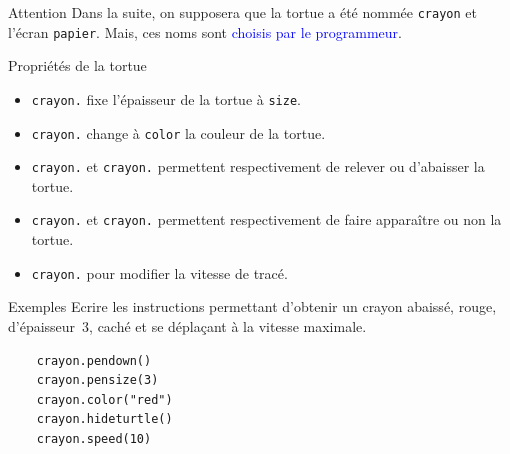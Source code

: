 \documentclass[10pt]{beamer}
\begin{document}
\begin{frame}[fragile]
	\mframe{\Python}
	\begin{alertblock}{\textcolor{yellow}{\danger} Attention}
		Dans la suite, on supposera que la tortue a été nommée {\tt crayon} et l'écran {\tt papier}. Mais, ces noms sont \textcolor{blue}{choisis par le programmeur}.
	\end{alertblock}
	\begin{block}{Propriétés de la tortue}
		\begin{itemize}
			\item<2-> {\tt crayon.} fixe l'épaisseur de la tortue à {\tt size}.
			\item<3-> {\tt crayon.} change à {\tt color} la couleur de la tortue.
			\item<4-> {\tt crayon.} et {\tt crayon.} permettent respectivement de relever ou d'abaisser la tortue.
			\item<5-> {\tt crayon.} et {\tt crayon.} permettent respectivement de faire apparaître ou non la tortue.
			\item<6-> {\tt crayon.}  pour modifier la vitesse de tracé.
		\end{itemize}
	\end{block}
\end{frame}

\begin{frame}[fragile]
	\mframe{\Python}
	\begin{exampleblock}{Exemples}
		Ecrire les instructions permettant d'obtenir un crayon abaissé, rouge, d'épaisseur~3, caché et se déplaçant à la vitesse maximale.\pause
		\begin{lstlisting}
	crayon.pendown() 
	crayon.pensize(3)
	crayon.color("red")
	crayon.hideturtle()
	crayon.speed(10)
	\end{lstlisting}
	\end{exampleblock}
\end{frame}
\end{document}
